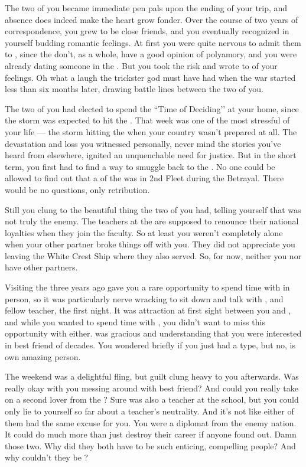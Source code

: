 \documentclass[char]{GL2020}
\begin{document}
The two of you became immediate pen pals upon the ending of your trip, and absence does indeed make the heart grow fonder. Over the course of two years of correspondence, you grew to be close friends, and you eventually recognized in yourself budding romantic feelings. At first you were quite nervous to admit them to \cBeetle{}, since the \pTech{} don’t, as a whole, have a good opinion of polyamory, and you were already dating someone in the \pShip{}. But you took the risk and wrote to \cBeetle{\them} of your feelings. Oh what a laugh the trickster god must have had when the war started less than six months later, drawing battle lines between the two of you. 

The two of you had elected to spend the ``Time of Deciding’’ at your home, since the storm was expected to hit the \pTech{}. That week was one of the most stressful of your life — the storm hitting the \pShip{} when your country wasn’t prepared at all. The devastation and loss you witnessed personally, never mind the stories you’ve heard from elsewhere, ignited an unquenchable need for justice. But in the short term, you first had to find a way to smuggle \cBeetle{} back to the \pSchool{}. No one could be allowed to find out that a \cBeetle{\cleric} of the \pTech{} was in 2nd Fleet during the Betrayal. There would be no questions, only retribution.

Still you clung to the beautiful thing the two of you had, telling yourself that \cBeetle{} was not truly the enemy. The teachers at the \pSc{} are supposed to renounce their national loyalties when they join the faculty. So at least you weren’t completely alone when your other partner broke things off with you. They did not appreciate you leaving the White Crest Ship where they also served. So, for now, neither you nor \cBeetle{} have other partners.

Visiting the \pSchool{} three years ago gave you a rare opportunity to spend time with \cBeetle{} in person, so it was particularly nerve wracking to sit down and talk with \cBeetle{}, and \cBeetle{\their} fellow teacher, \cEthics{} the first night. It was attraction at first sight between you and \cEthics{}, and while you wanted to spend time with \cBeetle{}, you didn’t want to miss this opportunity with \cEthics{} either. \cBeetle{} was gracious and understanding that you were interested in \cBeetle{\their} best friend of decades. You wondered briefly if you just had a type, but no, \cEthics{} is \cEthics{\their} own amazing person. 

The weekend was a delightful fling, but guilt clung heavy to you afterwards. Was \cBeetle{} really okay with you messing around with \cBeetle{\their} best friend? And could you really take on a second lover from the \pTech{}? Sure \cEthics{} was also a teacher at the school, but you could only lie to yourself so far about a teacher’s neutrality. And it’s not like either of them had the same excuse for you. You were a diplomat from the enemy nation. It could do much more than just destroy their career if anyone found out. Damn those two. Why did they both have to be such enticing, compelling people? And why couldn’t they be \pShippies{}?
\end{document}

